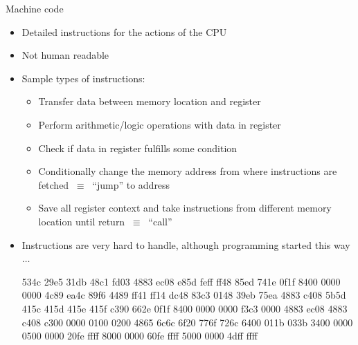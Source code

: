 
\begin{frame}[fragile]{Machine code}

  \begin{itemize}
    \tightlist
  \item
    Detailed instructions for the actions of the CPU
  \item
    Not human readable
  \item
    Sample types of instructions:

    \begin{itemize}
      \tightlist
    \item
      Transfer data between memory location and register
    \item
      Perform arithmetic/logic operations with data in register
    \item
      Check if data in register fulfills some condition
    \item
      Conditionally change the memory address from where instructions are
      fetched \(~\equiv~\) ``jump'' to address
    \item
      Save all register context and take instructions from different
      memory location until return \(~\equiv~\) ``call''
    \end{itemize}

  \item Instructions are very hard to handle, although programming 
    started this way $\dots$

    \begin{textcode}
      534c 29e5 31db 48c1 fd03 4883 ec08 e85d 
      feff ff48 85ed 741e 0f1f 8400 0000 0000 
      4c89 ea4c 89f6 4489 ff41 ff14 dc48 83c3 
      0148 39eb 75ea 4883 c408 5b5d 415c 415d 
      415e 415f c390 662e 0f1f 8400 0000 0000 
      f3c3 0000 4883 ec08 4883 c408 c300 0000 
      0100 0200 4865 6c6c 6f20 776f 726c 6400 
      011b 033b 3400 0000 0500 0000 20fe ffff 
      8000 0000 60fe ffff 5000 0000 4dff ffff 
    \end{textcode}
  \end{itemize}

\end{frame}

